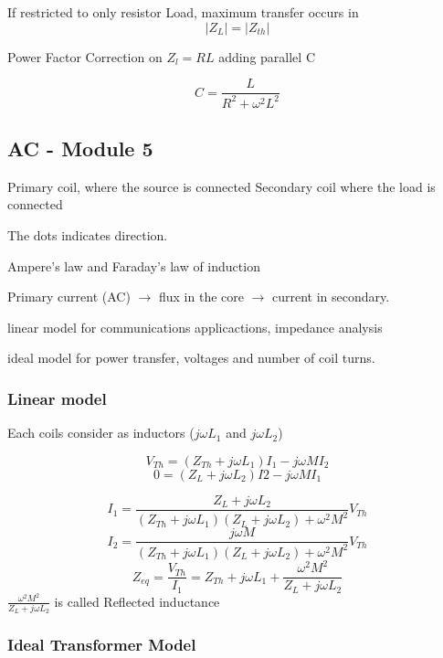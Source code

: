 \documentclass[]{article}
\begin{document}
If restricted to only resistor Load, maximum transfer occurs in
$$|Z_L|=|Z_{th}|$$

Power Factor Correction on $Z_l=RL$ adding parallel C

$$C=\frac{L}{R^2+\omega^2L^2}$$
\subsection{AC - Module 5}
Primary coil, where the source is connected
Secondary coil where the load is connected

The dots indicates direction. 

Ampere's law and Faraday's law of induction

Primary current (AC) $\rightarrow$ flux in the core $\rightarrow$ current in secondary.

linear model for communications applicactions, impedance analysis

ideal model for power transfer, voltages and number of coil turns.


\subsubsection{Linear model}
Each coils consider as inductors ($j\omega L_1$ and $j\omega L_2$)



$$ V_{Th}=(Z_{Th}+j\omega L_1)I_1- j\omega MI_2 $$
$$ 0 = (Z_L + j\omega L_2)I2 - j\omega MI_1$$

$$I_1= \frac{Z_L+j\omega L_2}{(Z_{Th} + j\omega L_1)(Z_L + j\omega L_2)+\omega^2M^2}V_{Th}$$
$$I_2= \frac{j\omega M}{(Z_{Th} + j\omega L_1)(Z_L + j\omega L_2)+\omega^2M^2}V_{Th}$$
$$Z_{eq}=\frac{V_{Th }}{I_1}=Z_{Th}+j\omega L_1 + \frac{\omega^2M^2}{Z_L+j\omega L_2}$$
$\frac{\omega^2M^2}{Z_L+j\omega L_2}$ is called Reflected inductance

\subsubsection{Ideal Transformer Model}
\end{document}
